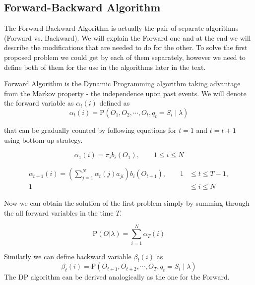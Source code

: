 \documentclass[thesis=M,english]{FITthesis}[2012/10/20]
\begin{document}
\subsection{Forward-Backward Algorithm}
The Forward-Backward Algorithm is actually the pair of separate algorithms (Forward vs. Backward). We will explain the Forward one and at the end we will describe the modifications that are needed to do for the other. To solve the first proposed problem we could get by each of them separately, however we need to define both of them for the use in the algorithms later in the text.  

Forward Algorithm is the Dynamic Programming algorithm taking advantage from the Markov property - the independence upon past events. We will denote the forward variable as $\alpha_t(i)$ defined as
\begin{equation}
\alpha_t(i) = \mathrm{P}(O_1,O_2,\cdots,O_t,q_t = S_i \mid \lambda )
\end{equation}

that can be gradually counted by following equations for $t=1$ and $t=t+1$ using bottom-up strategy.

\begin{equation}
\alpha_1(i) = \pi_i b_i(O_1), \qquad 1 \leq i \leq N
\end{equation}

\begin{equation}
\begin{aligned}
\alpha_{t+1}(i) = \left( \sum_{j=1}^N \alpha_t(j) a_{ji} \right) b_i(O_{t+1}), \qquad 1& \leq t \leq T - 1, \\ 
                                                                                 1& \leq i \leq N		\end{aligned}
\end{equation}

  
Now we can obtain the solution of the first problem simply by summing through the all forward variables in the time $T$.

\begin{equation}
\mathrm{P}(O|\lambda) = \sum_{i=1}^N \alpha_T(i)
\end{equation} 

Similarly we can define backward variable $\beta_t(i)$ as
\begin{equation}
\beta_t(i) = \mathrm{P}(O_{t+1},O_{t+2},\cdots,O_T,q_t = S_i \mid \lambda ) 
\end{equation}
The DP algorithm can be derived analogically as the one for the Forward.
\end{document}
